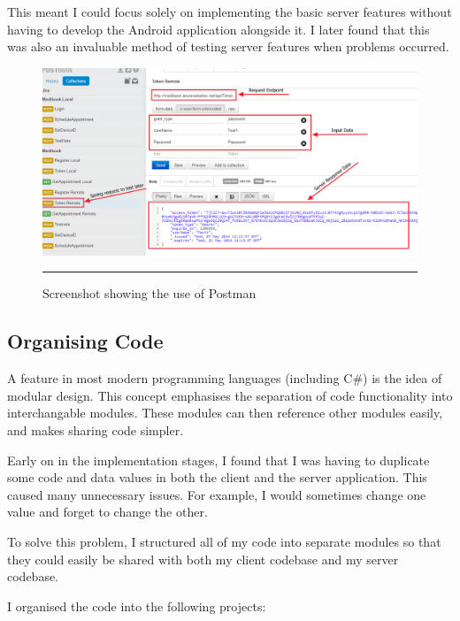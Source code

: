 This meant I could focus solely on implementing the basic server features without having to develop the Android application alongside it. I later found that this was also an invaluable method of testing server features when problems occurred.

\begin{figure}[htbp]
	\centering
		\includegraphics[width=\textwidth,height=\textheight,keepaspectratio]{Figures/Postman.png}
		\rule{35em}{0.5pt}
		\caption[Screenshot showing the use of Postman]{Screenshot showing the use of Postman}
	\label{fig:postman}
\end{figure}

\subsection{Organising Code}

A feature in most modern programming languages (including C\#) is the idea of modular design. This concept emphasises the separation of code functionality into interchangable modules. These modules can then reference other modules easily, and makes sharing code simpler.

Early on in the implementation stages, I found that I was having to duplicate some code and data values in both the client and the server application. This caused many unnecessary issues. For example, I would sometimes change one value and forget to change the other.

To solve this problem, I structured all of my code into separate modules so that they could easily be shared with both my client codebase and my server codebase. 

I organised the code into the following projects:

